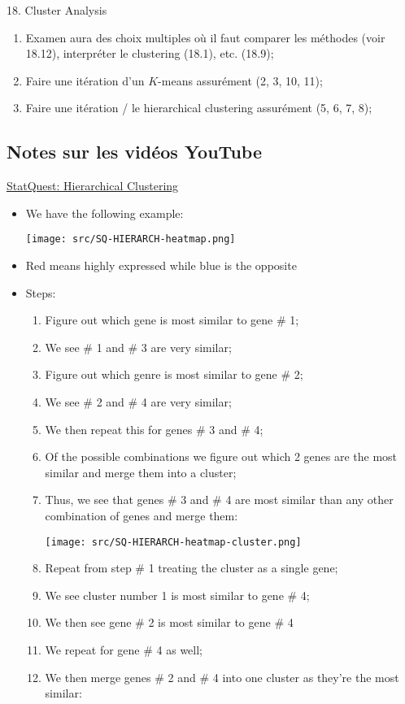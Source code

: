 \documentclass[12pt, titlepage, french]{report}
\begin{document}
\begin{CHPT_SUMM}[label = {CLUSTERS}]{18. Cluster Analysis}
\begin{enumerate}
	\item	Examen aura des choix multiples où il faut comparer les méthodes (voir 18.12), interpréter le clustering (18.1), etc. (18.9);
	\item	Faire une itération d'un $K$-means assurément (2, 3, 10, 11);
	\item	Faire une itération / le hierarchical clustering assurément (5, 6, 7, 8);
\end{enumerate}
\end{CHPT_SUMM}

\subsection{Notes sur les vidéos YouTube}

\begin{YTB_SUMM}{\href{https://www.youtube.com/watch?v=7xHsRkOdVwo&list=PLblh5JKOoLUICTaGLRoHQDuF_7q2GfuJF&index=31}{StatQuest: Hierarchical Clustering}}
\begin{itemize}
	\item	We have the following example:
	
	\texttt{[image: src/SQ-HIERARCH-heatmap.png]}
	\item[]	Red means highly expressed while blue is the opposite
	\item	Steps:
		\begin{enumerate}
		\item	Figure out which gene is most similar to gene \# 1;
		\item[]	We see \# 1 and \# 3 are very similar;
		\item	Figure out which genre is most similar to gene \# 2;
		\item[]	We see \# 2 and \# 4 are very similar;
		\item[]	We then repeat this for genes \# 3 and \# 4;
		\item	Of the possible combinations we figure out which 2 genes are the most similar and merge them into a cluster;
		\item[]	Thus, we see that genes \# 3 and \# 4 are most similar than any other combination of genes and merge them:
		
		\texttt{[image: src/SQ-HIERARCH-heatmap-cluster.png]}
		\item	Repeat from step \# 1 treating the cluster as a single gene;
		\item[]	We see cluster number 1 is most similar to gene \# 4;
		\item	We then see gene \# 2 is most similar to gene \# 4 
		\item[]	We repeat for gene \# 4 as well;
		\item	We then merge genes \# 2 and \# 4 into one cluster as they're the most similar:
		

\end{enumerate}
\end{itemize}
\end{YTB_SUMM}
\end{document}
